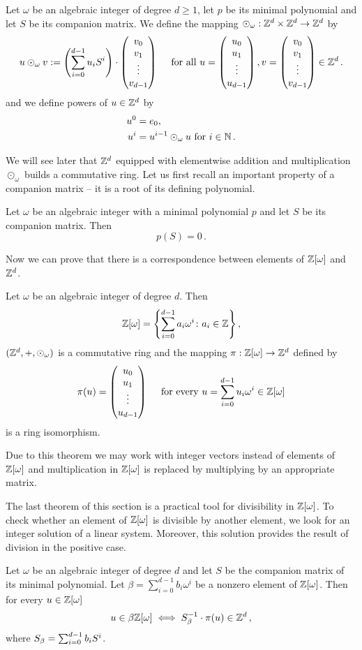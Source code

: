 \begin{upravit}
\begin{defn}
Let $\omega$ be an algebraic integer of degree $d\geq 1$, let $p$ be its minimal polynomial and let $S$ be its companion matrix. We define the mapping $\odot_\omega: \mathbb{Z}^d \times \mathbb{Z}^d \rightarrow \mathbb{Z}^d$ by 
$$
u \odot_\omega v := \left(\sum_{i=0}^{d-1} {u}_i S^i\right)\cdot \begin{pmatrix} {v}_0 \\ {v}_1 \\ \vdots \\ {v}_{d-1} \end{pmatrix} \quad \text{ for all } u=\begin{pmatrix} {u}_0 \\ {u}_1 \\ \vdots \\ {u}_{d-1} \end{pmatrix}, v=\begin{pmatrix} {v}_0 \\ {v}_1 \\ \vdots \\ {v}_{d-1} \end{pmatrix} \in \mathbb{Z}^d\,.
$$ 
and we define powers of $u \in \mathbb{Z}^d$ by
\begin{align*}
    u^0&=e_0, \\
    u^{i}&= u^{i-1} \odot_\omega u \text{ for } i\in\mathbb{N}\,.
\end{align*}
\end{defn}

We will see later that $\mathbb{Z}^d$ equipped with elementwise addition and multiplication $\odot_\omega$ builds a commutative ring. 
Let us first recall an important property of a companion matrix  -- it is a root of its defining polynomial.
\begin{lem}
\label{lem:compMatrixIsRoot}
Let $\omega$ be an algebraic integer with a minimal polynomial $p$ and let $S$ be its companion matrix. Then
$$
p(S)=0\,.
$$
\end{lem}






Now we can prove that there is a correspondence between elements of $\mathbb{Z}[\omega]$ and $\mathbb{Z}^d$.

\begin{thm}
Let  $\omega$ be an algebraic integer of degree $d$. Then 
$$
\mathbb{Z}[\omega] =\left\{\sum_{i=0}^{d-1} a_i \omega^i \colon a_i\in\mathbb{Z} \right\},
$$ 
$(\mathbb{Z}^d,+,\odot_\omega)$ is a commutative ring and the mapping $\pi:\mathbb{Z}[\omega] \rightarrow \mathbb{Z}^{d}$ defined by 
$$
\pi(u)=\begin{pmatrix} {u}_0 \\ {u}_1 \\ \vdots \\ {u}_{d-1} \end{pmatrix} \quad \text{ for every } u=\sum_{i=0}^{d-1} u_i \omega^i \in \mathbb{Z}[\omega]
$$
is a ring isomorphism.
\end{thm}


Due to this theorem we may work with integer vectors instead of elements of $\mathbb{Z}[\omega]$ and multiplication in $\mathbb{Z}[\omega]$ is replaced by multiplying by an appropriate matrix. 

The last theorem of this section is a practical tool for divisibility in $\mathbb{Z}[\omega]$. To check whether an element of $\mathbb{Z}[\omega]$ is divisible by another element, we look for an integer solution of a linear system. Moreover, this solution provides the result of  division in the positive case. 
\begin{thm}
\label{thm:divisibility}
Let $\omega$ be an algebraic integer of degree $d$ and let $S$ be the companion matrix of its minimal polynomial. Let $\beta=\sum_{i=0}^{d-1} b_i \omega^i$ be a nonzero element of $\mathbb{Z}[\omega]$. Then for every $u\in\mathbb{Z}[\omega]$
$$
u\in\beta\mathbb{Z}[\omega] \iff S_\beta^{-1}\cdot \pi(u) \in \mathbb{Z}^d\,,
$$
where $S_\beta=\sum_{i=0}^{d-1} {b}_i S^i$.
\end{thm}


\end{upravit}